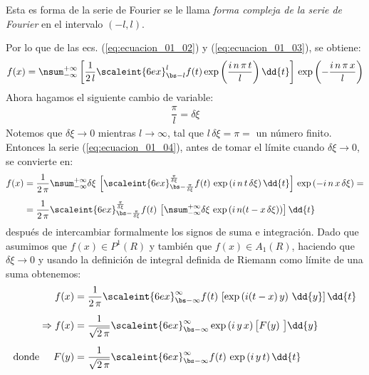 Esta es forma de la serie de Fourier se le llama \emph{forma compleja de la serie de Fourier} en el intervalo $(-l , l)$.
\par
Por lo que de las ecs. (\ref{eq:ecuacion_01_02}) y (\ref{eq:ecuacion_01_03}), se obtiene:
\begin{align}
f(x) = \nsum_{-\infty}^{+\infty} \left[ \dfrac{1}{2 \, l} \scaleint{6ex}_{\bs -l}^{l} f(t) \exp \left( \dfrac{i \, n \, \pi \, t}{l} \right) \dd{t} \right] \, \exp \left( - \dfrac{i \, n \, \pi \, x}{l} \right)
\label{eq:ecuacion_01_04}
\end{align}
Ahora hagamos el siguiente cambio de variable:
\begin{align*}
\dfrac{\pi}{l} = \delta \xi
\end{align*}
Notemos que $\delta \xi \to 0$ mientras $l \to \infty$, tal que $l \, \delta \xi = \pi =$ un número finito. Entonces la serie (\ref{eq:ecuacion_01_04}), antes de tomar el límite cuando $\delta \xi \to 0$, se convierte en:
\begin{align*}
f(x) &= \dfrac{1}{2 \, \pi} \nsum_{-\infty}^{+\infty} \delta \xi \, \left[ \scaleint{6ex}_{\bs -\frac{\pi}{\delta \xi}}^{\frac{\pi}{\delta \xi}} f(t) \, \exp \left( i \, n \, t \, \delta \xi \right) \dd{t} \right] \, \exp \left( - i \, n \, x \, \delta \xi \right) = \\[0.5em]
&= \dfrac{1}{2 \, \pi} \scaleint{6ex}_{\bs -\frac{\pi}{\delta \xi}}^{\frac{\pi}{\delta \xi}} f(t) \, \left[ \nsum_{-\infty}^{+\infty} \delta \xi \, \exp \left( i \, n (t - x \, \delta \xi) \right) \right] \dd{t}
\end{align*}
después de intercambiar formalmente los signos de suma e integración. Dado que asumimos que  $f (x) \in P^{1} (R)$ y también que $f (x) \in A_{1} (R)$, haciendo que $\delta \xi \to 0$ y usando la definición de integral definida de Riemann como límite de una suma obtenemos:
\begin{align}
f(x) &= \dfrac{1}{2 \, \pi} \scaleint{6ex}_{\bs -\infty}^{\infty} f(t) \, \left[ \exp \left( i (t - x) \, y \right) \, \dd{y} \right] \dd{t} \label{eq:ecuacion_01_05} \\[0.5em]
\Rightarrow f(x) &= \dfrac{1}{\sqrt{2 \, \pi}} \scaleint{6ex}_{\bs -\infty}^{\infty} \exp \left( i \, y \, x \right) \big[ F(y) \big] \dd{y} \label{eq:ecuacion_01_06} \\[0.5em]
\mbox{donde} \hspace{0.5cm} F(y) &= \dfrac{1}{\sqrt{2 \, \pi}} \scaleint{6ex}_{\bs -\infty}^{\infty} f(t) \, \exp \left( i \, y \, t \right) \dd{t} \label{eq:ecuacion_01_07}
\end{align}
